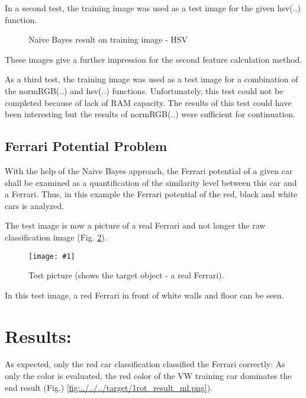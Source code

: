 \documentclass[a4paper,headings=small]{scrartcl}
\numberwithin{equation}{section} %
\numberwithin{figure}{section}   %
\newcommand{\image}[3]{
	\begin{figure}[htbp]
		\centering
		\texttt{[image: \#1]}
		\caption{#3}
		\label{fig:#1}
	\end{figure}
}
\newcommand{\imgRoot}{../resources/img}
\newcommand{\imgGeneratedRoot}{../../../target}
\begin{document}
In a second test, the training image was used as a test image for the given hsv(..) function.

\begin{figure}
\hfill
{}
\caption{Naive Bayes result on training image - HSV}
\label{fig:label6}
\end{figure}

These images give a further impression for the second feature calculation method.

As a third test, the training image was used as a test image for a combination of the normRGB(..) and hsv(..) functions. Unfortunately, this test could not be completed because of lack of RAM capacity.
The results of this test could have been interesting but the results of normRGB(..) were sufficient for continuation.

\subsection{Ferrari Potential Problem}
With the help of the Naive Bayes approach, the Ferrari potential of a given car shall be examined as a quantification of the similarity level between this car and a Ferrari. Thus, in this example the Ferrari potential of the red, black and white cars is analyzed.


The test image is now a picture of a real Ferrari and not longer the raw classification image (Fig. \ref{fig:\imgRoot/test_image1.jpeg}).

\image{\imgRoot/test_image1.jpeg}{0.8}{%
		Test picture (shows the target object - a real Ferrari).}

In this test image, a red Ferrari in front of white walls and floor can be seen.

\section{Results:}

As expected, only the red car classification classified the Ferrari correctly: As only the color is evaluated, the red color of the VW training car dominates the end result
(Fig.) \ref{fig:\imgGeneratedRoot/1rot_result_ml.png}).
\end{document}
